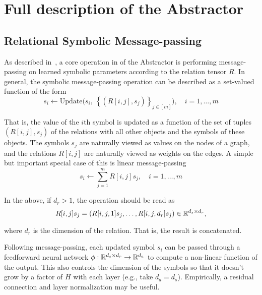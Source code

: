
\def\m{m}

\section{Full description of the Abstractor}\label{sec:message_passing_supplement} %

\subsection{Relational Symbolic Message-passing}

As described in~, a core operation in of the Abstractor is performing message-passing on learned symbolic parameters according to the relation tensor $R$. In general, the symbolic message-passing operation can be described as a set-valued function of the form
\begin{equation}
    \label{eq:symbolic_message_passing_supp}
    s_i \leftarrow \text{Update}\Big( s_i, \ \left\{ \left(R[i,j], s_j\right)\right\}_{j\in[m]}\Big), \quad i = 1, \ldots, m
\end{equation}

That is, the value of the $i$th symbol is updated as a function of the set of tuples $(R[i,j], s_j)$ of the relations with all other objects and the symbols of these objects. The symbols $s_j$ are naturally viewed as values on the nodes of a graph, and the relations $R[i,j]$ are naturally viewed as weights on the edges. A simple but important special case of this is linear message-passing
\begin{equation}
    \label{eq:linear_symbolic_mp:supp}
    s_i \leftarrow \sum_{j=1}^{m} R[i,j] s_j, \quad i=1, \ldots, m
\end{equation}

In the above, if $d_r > 1$, the operation should be read as
\begin{equation*}
    R[i,j] s_j = \left( R[i,j,1] s_j, \ldots, R[i,j, d_r] s_j \right) \in \mathbb{R}^{d_s \times d_r},
\end{equation*}

where $d_r$ is the dimension of the relation. That is, the result is concatenated.

Following message-passing, each updated symbol $s_i$ can be passed through a feedforward neural network $\phi: \mathbb{R}^{d_s \times d_r} \rightarrow \mathbb{R}^{d_a}$ to compute a non-linear function of the output. This also controls the dimension of the symbols so that it doesn't grow by a factor of $H$ with each layer (e.g., take $d_a = d_s$). Empirically, a residual connection and layer normalization may be useful.

